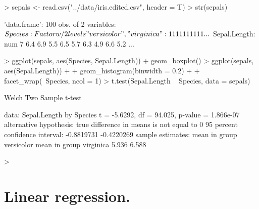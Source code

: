 \documentclass[a4paper,12pt]{article}
\begin{document}
\begin{Schunk}
\begin{Sinput}
> sepals <- read.csv("../data/iris.edited.csv", header = T)
> str(sepals)
\end{Sinput}
\begin{Soutput}
'data.frame':	100 obs. of  2 variables:
 $ Species     : Factor w/ 2 levels "versicolor","virginica": 1 1 1 1 1 1 1 1 1 1 ...
 $ Sepal.Length: num  7 6.4 6.9 5.5 6.5 5.7 6.3 4.9 6.6 5.2 ...
\end{Soutput}
\begin{Sinput}
> ggplot(sepals, aes(Species, Sepal.Length)) + geom_boxplot()
> ggplot(sepals, aes(Sepal.Length)) + 
+   geom_histogram(binwidth = 0.2) + 
+   facet_wrap(~Species, ncol = 1)
> t.test(Sepal.Length ~ Species, data = sepals)
\end{Sinput}
\begin{Soutput}
	Welch Two Sample t-test

data:  Sepal.Length by Species
t = -5.6292, df = 94.025, p-value = 1.866e-07
alternative hypothesis: true difference in means is not equal to 0
95 percent confidence interval:
 -0.8819731 -0.4220269
sample estimates:
mean in group versicolor  mean in group virginica 
                   5.936                    6.588 
\end{Soutput}
\begin{Sinput}
> 
\end{Sinput}
\end{Schunk}

\section{Linear regression.}
\end{document}
